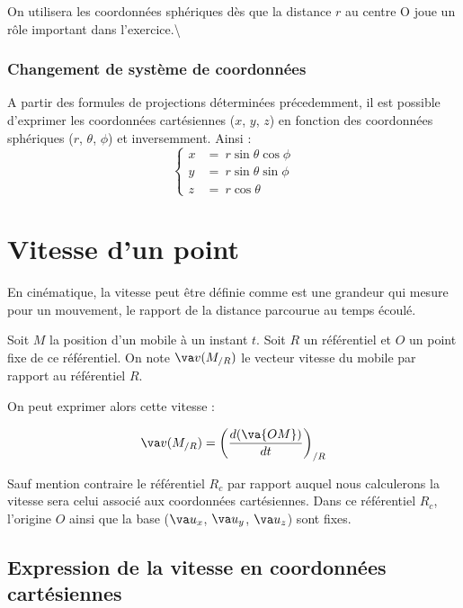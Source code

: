 \documentclass[
  12pt,
  openany]{book}
\theoremstyle{plain}
\theoremstyle{remark}
\begin{document}
On utilisera les coordonnées sphériques dès que la distance \(r\) au
centre O joue un rôle important dans l'exercice.\textbackslash{}

\subsection{Changement de système de
coordonnées}\label{changement-de-systuxe8me-de-coordonnuxe9es-1}

A partir des formules de projections déterminées précedemment, il est
possible d'exprimer les coordonnées cartésiennes (\(x\), \(y\), \(z\))
en fonction des coordonnées sphériques (\(r\), \(\theta\), \(\phi\)) et
inversemment. Ainsi : \begin{equation*}
    \begin{cases}
      x &= \ r \sin{\theta}\cos{\phi}  \\
      y &= \ r \sin{\theta}\sin{\phi} \\
      z &= \ r \cos{\theta}
    \end{cases}       
\end{equation*}

\chapter{Vitesse d'un point}\label{vitesse-dun-point}

En cinématique, la vitesse peut être définie comme est une grandeur qui
mesure pour un mouvement, le rapport de la distance parcourue au temps
écoulé.

Soit \(M\) la position d'un mobile à un instant \(t\). Soit \(R\) un
référentiel et \(O\) un point fixe de ce référentiel. On note
\(\va v(M_{/R})\) le vecteur vitesse du mobile par rapport au
référentiel \(R\).

On peut exprimer alors cette vitesse :

\begin{align*}
 \va v(M_{/R})=\left(\dfrac{d(\va{OM})}{dt}\right)_{/R}
\end{align*}

Sauf mention contraire le référentiel \(R_c\) par rapport auquel nous
calculerons la vitesse sera celui associé aux coordonnées cartésiennes.
Dans ce référentiel \(R_c\), l'origine \(O\) ainsi que la base
(\(\va u_x\), \(\va u_y\), \(\va u_z\)) sont fixes.

\section{Expression de la vitesse en coordonnées
cartésiennes}\label{expression-de-la-vitesse-en-coordonnuxe9es-cartuxe9siennes}
\end{document}
